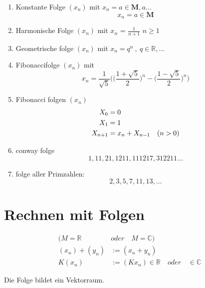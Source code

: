 \begin{example}
    \[\]
    \begin{enumerate}

        \item Konstante Folge $(x_n)$ mit \quad $x_n = a \in \mathbf{M },a \dots$ \\
        \[ x_n = a \in \mathbf{M} \]
        \item Harmonische Folge $(x_n)$  mit $x_n$ =  $\frac{1}{n+1}$ \quad$ n \geq 1$
        \item Geometrische folge $(x_n)$ mit $x_n = q^n \:, \: q \in \mathbb{R}, \dots $
        \item Fibonaccifolge $(x_n)$ mit
        \[ x_n =\frac{1}{\sqrt{5}} \Big(  \big( \frac{1+ \sqrt{5}}{2} \big)^n - \big( \frac{1- \sqrt{5}}{2}\big)^n   \Big)    \]

        \item Fibonacci folgen $(x_n)$
        \begin{align}
            X_0 &=0 \notag \\X_1 &= 1 \notag \\
            X_{n+1} &= x_n+X_{n-1} \quad (n>0)  \notag
        \end{align}

        \item conway  folge
        \[ 1, 11 ,21 , 1211, 111217, 312211 \dots \]

        \item folge aller Primzahlen: \[ 2, 3 ,5 ,7 ,11, 13 , \dots \]

    \end{enumerate}
\end{example}

\section{Rechnen mit Folgen }
\begin{align*}
    ( M  = \mathbb{R} \quad & oder \quad M = \mathbb{C} ) \\
    (x_n)+(y_n) &:= (x_n+y_n)\\
    K(x_n)&:=(Kx_n)\in \mathbb{R} \quad  oder \quad \in  \mathbb{C}
\end{align*}
\begin{remark}

    Die Folge bildet ein Vektorraum.
\end{remark}
\newpage


